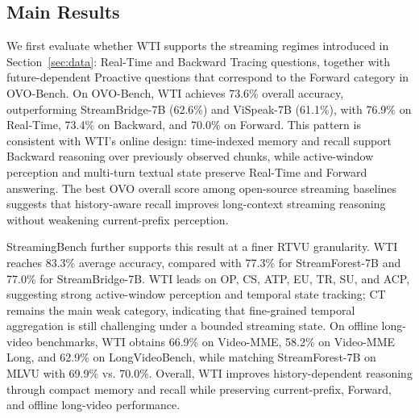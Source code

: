 \subsection{Main Results}

We first evaluate whether WTI supports the streaming regimes introduced in Section~\ref{sec:data}: Real-Time and Backward Tracing questions, together with future-dependent Proactive questions that correspond to the Forward category in OVO-Bench.
On OVO-Bench, WTI achieves 73.6\% overall accuracy, outperforming StreamBridge-7B (62.6\%) and ViSpeak-7B (61.1\%), with 76.9\% on Real-Time, 73.4\% on Backward, and 70.0\% on Forward.
This pattern is consistent with WTI's online design: time-indexed memory and recall support Backward reasoning over previously observed chunks, while active-window perception and multi-turn textual state preserve Real-Time and Forward answering.
The best OVO overall score among open-source streaming baselines suggests that history-aware recall improves long-context streaming reasoning without weakening current-prefix perception.

StreamingBench further supports this result at a finer RTVU granularity.
WTI reaches 83.3\% average accuracy, compared with 77.3\% for StreamForest-7B and 77.0\% for StreamBridge-7B.
WTI leads on OP, CS, ATP, EU, TR, SU, and ACP, suggesting strong active-window perception and temporal state tracking; CT remains the main weak category, indicating that fine-grained temporal aggregation is still challenging under a bounded streaming state.
On offline long-video benchmarks, WTI obtains 66.9\% on Video-MME, 58.2\% on Video-MME Long, and 62.9\% on LongVideoBench, while matching StreamForest-7B on MLVU with 69.9\% vs. 70.0\%.
Overall, WTI improves history-dependent reasoning through compact memory and recall while preserving current-prefix, Forward, and offline long-video performance.

